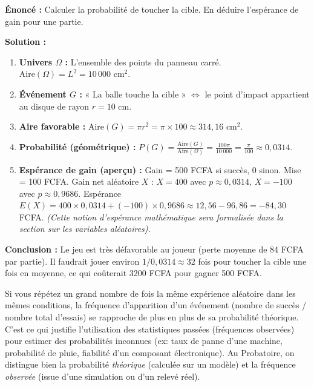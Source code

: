 \documentclass[11pt]{article}
\newcommand{\cle}[1]{{\popxbold\color{popdark}#1}}
\begin{document}
\begin{exoresolu}
\textbf{Énoncé :} Calculer la probabilité de toucher la cible. En déduire l'espérance de gain pour une partie.

\textbf{Solution :}
\begin{enumerate}
    \item \textbf{Univers $\Omega$ :} L'ensemble des points du panneau carré. $\text{Aire}(\Omega) = L^2 = 10\,000 \text{ cm}^2$.
    \item \textbf{Événement $G$ :} « La balle touche la cible » $\iff$ le point d'impact appartient au disque de rayon $r=10$ cm.
    \item \textbf{Aire favorable :} $\text{Aire}(G) = \pi r^2 = \pi \times 100 \approx 314,16 \text{ cm}^2$.
    \item \textbf{Probabilité (géométrique) :} $P(G) = \frac{\text{Aire}(G)}{\text{Aire}(\Omega)} = \frac{100\pi}{10\,000} = \frac{\pi}{100} \approx 0,0314$.
    \item \textbf{Espérance de gain (aperçu) :} Gain = 500 FCFA si succès, 0 sinon. Mise = 100 FCFA.
        Gain net aléatoire $X$ : $X = 400$ avec $p \approx 0,0314$, $X = -100$ avec $p \approx 0,9686$.
        Espérance $E(X) = 400 \times 0,0314 + (-100) \times 0,9686 \approx 12,56 - 96,86 = -84,30$ FCFA.
        \emph{(Cette notion d'espérance mathématique sera formalisée dans la section sur les variables aléatoires).}
\end{enumerate}
\textbf{Conclusion :} Le jeu est très défavorable au joueur (perte moyenne de 84 FCFA par partie). Il faudrait jouer environ $1/0,0314 \approx 32$ fois pour toucher la cible une fois en moyenne, ce qui coûterait 3200 FCFA pour gagner 500 FCFA.
\end{exoresolu}

\begin{savaistu}
Si vous répétez un grand nombre de fois la même expérience aléatoire dans les mêmes conditions, la \cle{fréquence} d'apparition d'un événement (nombre de succès / nombre total d'essais) se rapproche de plus en plus de sa \cle{probabilité théorique}.
C'est ce qui justifie l'utilisation des statistiques passées (fréquences observées) pour estimer des probabilités inconnues (ex: taux de panne d'une machine, probabilité de pluie, fiabilité d'un composant électronique). Au Probatoire, on distingue bien la probabilité \emph{théorique} (calculée sur un modèle) et la fréquence \emph{observée} (issue d'une simulation ou d'un relevé réel).
\end{savaistu}
\end{document}
